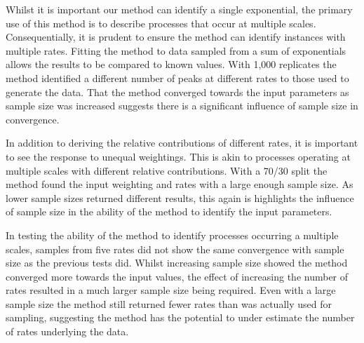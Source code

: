 \documentclass[11pt,usenames,dvipsnames]{article}
\begin{document}
Whilst it is important our method can identify a single exponential, the primary use of this method is to describe processes that occur at multiple scales. Consequentially, it is prudent to ensure the method can identify instances with multiple rates. Fitting the method to data sampled from a sum of exponentials allows the results to be compared to known values. With 1,000 replicates the method identified a different number of peaks at different rates to those used to generate the data. That the method converged towards the input parameters as sample size was increased suggests there is a significant influence of sample size in convergence.

In addition to deriving the relative contributions of different rates, it is important to see the response to unequal weightings. This is akin to processes operating at multiple scales with different relative contributions. With a 70/30 split the method found the input weighting and rates with a large enough sample size. As lower sample sizes returned different results, this again is highlights the influence of sample size in the ability of the method to identify the input parameters.

In testing the ability of the method to identify processes occurring a multiple scales, samples from five rates did not show the same convergence with sample size as the previous tests did. Whilst increasing sample size showed the method converged more towards the input values, the effect of increasing the number of rates resulted in a much larger sample size being required. Even with a large sample size the method still returned fewer rates than was actually used for sampling, suggesting the method has the potential to under estimate the number of rates underlying the data. 
\end{document}
